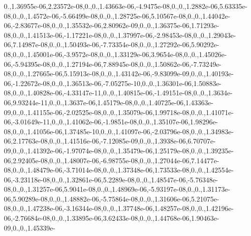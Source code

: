 {0.,1.\-36955e-\/06,2.\-23572e-\/08,0.,0.,1.\-43663e-\/06,-\/4.\-9475e-\/08,0.,0.,1.\-2882e-\/06,5.\-63335e-\/08,0.,0.,1.\-4572e-\/06,-\/5.\-66499e-\/08,0.,0.,1.\-28725e-\/06,5.\-10567e-\/08,0.,0.,1.\-44042e-\/06,-\/2.\-83677e-\/08,0.,0.,1.\-35532e-\/06,2.\-80962e-\/09,0.,0.,1.\-36375e-\/06,1.\-71293e-\/08,0.,0.,1.\-41513e-\/06,-\/1.\-17221e-\/08,0.,0.,1.\-37997e-\/06,-\/2.\-98453e-\/08,0.,0.,1.\-29043e-\/06,7.\-14987e-\/08,0.,0.,1.\-50493e-\/06,-\/7.\-73354e-\/08,0.,0.,1.\-27292e-\/06,5.\-90292e-\/08,0.,0.,1.\-45001e-\/06,-\/3.\-9572e-\/08,0.,0.,1.\-33129e-\/06,3.\-9654e-\/08,0.,0.,1.\-45026e-\/06,-\/5.\-94395e-\/08,0.,0.,1.\-27194e-\/06,7.\-88945e-\/08,0.,0.,1.\-50862e-\/06,-\/7.\-73249e-\/08,0.,0.,1.\-27665e-\/06,5.\-15913e-\/08,0.,0.,1.\-43142e-\/06,-\/9.\-83099e-\/09,0.,0.,1.\-40193e-\/06,-\/1.\-22672e-\/08,0.,0.,1.\-36513e-\/06,-\/7.\-05275e-\/10,0.,0.,1.\-36301e-\/06,1.\-50883e-\/08,0.,0.,1.\-40828e-\/06,-\/4.\-33147e-\/11,0.,0.,1.\-40815e-\/06,-\/1.\-49151e-\/08,0.,0.,1.\-3634e-\/06,9.\-93244e-\/11,0.,0.,1.\-3637e-\/06,1.\-45179e-\/08,0.,0.,1.\-40725e-\/06,1.\-43363e-\/09,0.,0.,1.\-41155e-\/06,-\/2.\-02525e-\/08,0.,0.,1.\-35079e-\/06,1.\-99718e-\/08,0.,0.,1.\-41071e-\/06,-\/3.\-01649e-\/11,0.,0.,1.\-41062e-\/06,-\/1.\-9851e-\/08,0.,0.,1.\-35107e-\/06,1.\-98296e-\/08,0.,0.,1.\-41056e-\/06,1.\-37485e-\/10,0.,0.,1.\-41097e-\/06,-\/2.\-03796e-\/08,0.,0.,1.\-34983e-\/06,2.\-17763e-\/08,0.,0.,1.\-41516e-\/06,-\/7.\-12085e-\/09,0.,0.,1.\-3938e-\/06,6.\-70707e-\/09,0.,0.,1.\-41392e-\/06,-\/1.\-97074e-\/08,0.,0.,1.\-35479e-\/06,1.\-25179e-\/08,0.,0.,1.\-39235e-\/06,2.\-92405e-\/08,0.,0.,1.\-48007e-\/06,-\/6.\-98755e-\/08,0.,0.,1.\-27044e-\/06,7.\-14477e-\/08,0.,0.,1.\-48479e-\/06,-\/3.\-71014e-\/08,0.,0.,1.\-37348e-\/06,1.\-73533e-\/08,0.,0.,1.\-42554e-\/06,-\/3.\-23118e-\/08,0.,0.,1.\-32861e-\/06,5.\-2289e-\/08,0.,0.,1.\-48547e-\/06,-\/5.\-76348e-\/08,0.,0.,1.\-31257e-\/06,5.\-9041e-\/08,0.,0.,1.\-48969e-\/06,-\/5.\-93197e-\/08,0.,0.,1.\-31173e-\/06,5.\-90289e-\/08,0.,0.,1.\-48882e-\/06,-\/5.\-75864e-\/08,0.,0.,1.\-31606e-\/06,5.\-21075e-\/08,0.,0.,1.\-47238e-\/06,-\/3.\-16344e-\/08,0.,0.,1.\-37748e-\/06,1.\-48257e-\/08,0.,0.,1.\-42196e-\/06,-\/2.\-76684e-\/08,0.,0.,1.\-33895e-\/06,3.\-62433e-\/08,0.,0.,1.\-44768e-\/06,1.\-90463e-\/09,0.,0.,1.\-45339e-}

